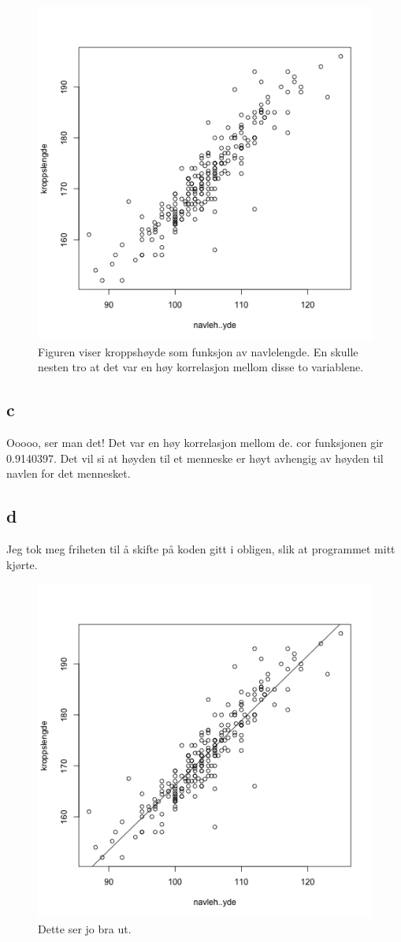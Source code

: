 \begin{figure}[H]
		\centering
		\includegraphics[width=0.4\linewidth]{3B.pdf}
		\caption{Figuren viser kroppshøyde som funksjon av navlelengde. En skulle nesten tro at det var en høy korrelasjon mellom disse to variablene.}
		\label{fig:3B}
\end{figure}



\subsection*{c}
Ooooo, ser man det! Det var en høy korrelasjon mellom de.
cor funksjonen gir 0.9140397. Det vil si at høyden til et menneske er høyt avhengig av høyden til navlen for det mennesket. 

\subsection*{d}
Jeg tok meg friheten til å skifte på koden gitt i obligen, slik at programmet mitt kjørte. 


\begin{figure}[H]
		\centering
		\includegraphics[width=0.7\linewidth]{3D.pdf}
		\caption{Dette ser jo bra ut. }
		\label{fig:3D}
\end{figure}


